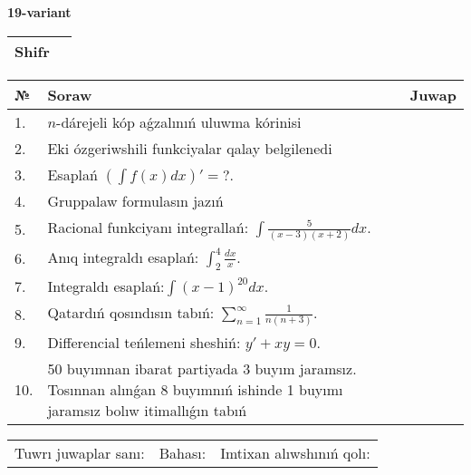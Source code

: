 \documentclass{article}
\begin{document}
  \egroup
  
  \newpage
  
  
  \textbf{19-variant}\\
  
  \bgroup
  \def\arraystretch{1.6} %
  
  \begin{tabular}{|m{5.7cm}|m{9.5cm}|}
  \hline
  Shifr & \\
  \hline
  \end{tabular}
  
  \vspace{1cm}
  
  \begin{tabular}{|m{0.7cm}|m{10cm}|m{4cm}|}
  \hline
  № & Soraw & Juwap \\
  \hline
  1. & \(n\)-dárejeli kóp aǵzalınıń uluwma kórinisi &  \\
  \hline
  2. & Eki ózgeriwshili funkciyalar qalay belgilenedi &  \\
  \hline
  3. & Esaplań \(\left( \int{f(x)dx} \right)' = ?\). &  \\
  \hline
  4. & Gruppalaw formulasın jazıń &  \\
  \hline
  5. & Racional funkciyanı integrallań: \(\int{\frac{5}{(x - 3)(x + 2)}dx}\). &  \\
  \hline
  6. & Anıq integraldı esaplań: \(\int_{2}^{4}\frac{dx}{x}\). &  \\
  \hline
  7. & Integraldı esaplań:\(\int{(x - 1)^{20}}dx\). &  \\
  \hline
  8. & Qatardıń qosındısın tabıń: \(\sum_{n = 1}^{\infty}\frac{1}{n(n + 3)}\). &  \\
  \hline
  9. & Differencial teńlemeni sheshiń: \(y' + xy = 0\). &  \\
  \hline
  10. & 50 buyımnan ibarat partiyada 3 buyım jaramsız. Tosınnan alınǵan 8 buyımnıń ishinde 1 buyımı jaramsız bolıw itimallıǵın tabıń &  \\
  \hline
  \end{tabular}
  
  \vspace{1cm}
  
  \begin{tabular}{lll}
  Tuwrı juwaplar sanı: \underline{\hspace{1.5cm}} & 
  Bahası: \underline{\hspace{1.5cm}} & 
  Imtixan alıwshınıń qolı: \underline{\hspace{2cm}} \\
  \end{tabular}
  
\end{document}
